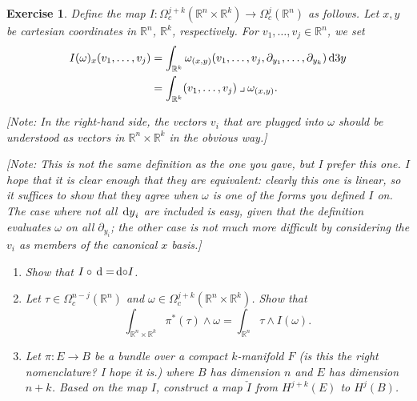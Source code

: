 \documentclass{article}
\newtheorem{ex}{Exercise}
\theoremstyle{nonumberplain}
\newcommand{\R}{\mathbb{R}}
\newcommand{\into}{\mathbin{\lrcorner}}
\begin{document}
\begin{ex}
Define the map $I \colon \Omega^{j+k}_c(\R^n \times \R^k) \to \Omega^j_c (\R^n)$ as follows. Let $x, y$ be cartesian coordinates in $\R^n$, $\R^k$, respectively. For $v_1, \dots, v_j \in \R^n$, we set
\begin{align*}
I(\omega)_x(v_1, \dots, v_j) &= \int_{\R^k} \omega_{(x,y)}(v_1, \dots, v_j, \partial_{y_1}, \dots, \partial_{y_k}) \dl3 y\\
&= \int_{\R^k} (v_1, \dots, v_j) \into \omega_{(x,y)}.
\end{align*}

[Note: In the right-hand side, the vectors $v_i$ that are plugged into $\omega$ should be understood as vectors in $\R^n \times \R^k$ in the obvious way.]

[Note: This is not the same definition as the one you gave, but I prefer this one. I hope that it is clear enough that they are equivalent: clearly this one is linear, so it suffices to show that they agree when $\omega$ is one of the forms you defined $I$ on. The case where not all $\dl y_i$ are included is easy, given that the definition evaluates $\omega$ on all $\partial_{y_i}$; the other case is not much more difficult by considering the $v_i$ as members of the canonical $x$ basis.]

\begin{enumerate}
\item Show that $I \circ \dl = \dl \circ I$.

\item Let $\tau \in \Omega^{n-j}_c(\R^n)$ and $\omega \in \Omega^{j+k}_c(\R^n \times \R^k)$. Show that
\[\int_{\R^n \times \R^k} \pi^*(\tau) \wedge \omega = \int_{\R^n} \tau \wedge I(\omega).\]

\item Let $\pi \colon E \to B$ be a bundle over a compact $k$-manifold $F$ (is this the right nomenclature? I hope it is.) where $B$ has dimension $n$ and $E$ has dimension $n+k$. Based on the map $I$, construct a map $\check I$ from $H^{j+k}(E)$ to $H^j(B)$.
\end{enumerate}
\end{ex}
\end{document}
